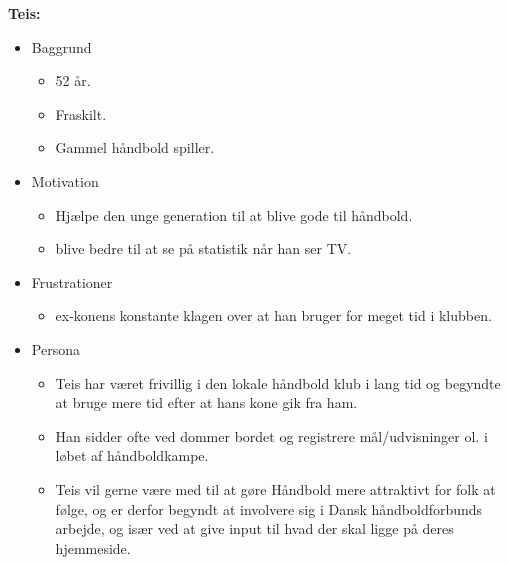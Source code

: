 \newpage
\textbf{Teis:}
\begin{itemize}
\item 	Baggrund
	\begin{itemize}
	\item 52 år.
	\item Fraskilt.
	\item Gammel håndbold spiller.
  	\end{itemize}	
\item Motivation
	\begin{itemize}
	\item Hjælpe den unge generation til at blive gode til håndbold.
	\item blive bedre til at se på statistik når han ser TV.
	\end{itemize}
\item Frustrationer
	\begin{itemize}
	\item ex-konens konstante klagen over at han bruger for meget tid i klubben.
	\end{itemize}
\item Persona
	\begin{itemize}
	\item Teis har været frivillig i den lokale håndbold klub i lang tid og begyndte at bruge mere tid efter at hans kone gik fra ham.
	\item Han sidder ofte ved dommer bordet og registrere mål/udvisninger ol. i løbet af håndboldkampe.
	\item Teis vil gerne være med til at gøre Håndbold mere attraktivt for folk at følge, og er derfor begyndt at involvere sig i Dansk håndboldforbunds arbejde, og især ved at give input til hvad der skal ligge på deres hjemmeside.
	\end{itemize}
\end {itemize}
